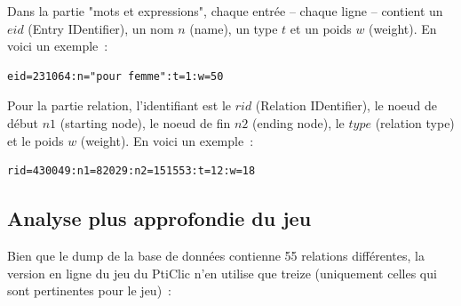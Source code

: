 \documentclass[a4paper,11pt,french]{article}
\begin{document}
Dans la partie "mots et expressions", chaque entrée -- chaque ligne -- contient un $eid$ (Entry IDentifier), un nom $n$ (name), un type $t$ et un poids $w$ (weight). En voici un exemple~:
\begin{verbatim}
eid=231064:n="pour femme":t=1:w=50
\end{verbatim}

Pour la partie relation, l'identifiant est le $rid$ (Relation IDentifier), le noeud de début $n1$ (starting node), le noeud de fin $n2$ (ending node), le $type$ (relation type) et le poids $w$ (weight). En voici un exemple~:
\begin{verbatim}
rid=430049:n1=82029:n2=151553:t=12:w=18
\end{verbatim}

\subsection{Analyse plus approfondie du jeu}
Bien que le dump de la base de données contienne 55 relations différentes, la version en ligne du jeu du PtiClic n'en utilise que treize (uniquement celles qui sont pertinentes pour le jeu)~:
\end{document}
